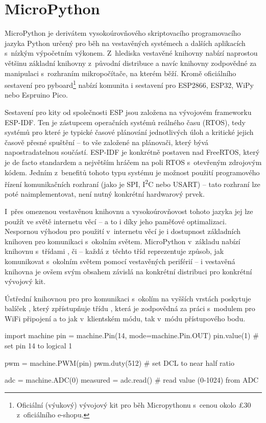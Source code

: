 \section{MicroPython}\label{sec:micropython}
MicroPython je derivátem vysokoúrovňového skriptovacího programovacího jazyka Python určený pro běh na vestavěných
systémech a dalších aplikacích s~nízkým výpočetním výkonem.
Z~hlediska vestavěné knihovny nabízí naprostou většinu základní knihovny z~původní distribuce a navíc knihovny
zodpovědné za manipulaci s~rozhraním mikropočítače, na kterém běží.
Kromě oficiálního sestavení pro pyboard\footnote{Oficiální (výukový) vývojový kit pro běh Micropythonu
s~cenou okolo \pounds30 z~oficiálního e-shopu.} nabízí komunita i sestavení pro ESP2866, ESP32, WiPy nebo Espruino Pico.

Sestavení pro kity od společnosti ESP jsou založena na vývojovém frameworku ESP-IDF.
Ten je zástupcem operačních systémů reálného času (RTOS), tedy systémů pro které je typické časové plánování
jednotlivých úloh a kritické jejich časově přesné spuštění -- to vše založené na plánovači, který bývá
napostradatelnou součástí.
ESP-IDF je konkrétně postaven nad FreeRTOS, který je de facto standardem a největším hráčem na poli RTOS s~otevřeným
zdrojovým kódem. 
Jedním z~benefitů tohoto typu systému je možnost použití programového řízení komunikačních rozhraní
(jako je SPI, I\textsuperscript{2}C nebo USART) -- tato rozhraní lze poté naimplementovat, není nutný konkrétní
hardwarový prvek.

I~přes omezenou vestavěnou knihovnu a vysokoúrovňovost tohoto jazyka jej lze použít ve světě internetu věcí --
a to i díky jeho paměťové optimalizaci.
Nespornou výhodou pro použití v~internetu věcí je i dostupnost základních knihoven pro komunikaci s~okolním světem.
MicroPython v~základu nabízí knihovnu  s~třídami ,  či  --
každá z~těchto tříd reprezentuje způsob, jak komunikovat s~okolním světem pomocí vestavěných periférií
-- i vestavěná knihovna je ovšem svým obsahem závislá na konkrétní distribuci pro konkrétní vývojový kit.

Ústřední knihovnou pro pro komunikaci s~okolím na vyšších vrstách poskytuje balíček , který zpřístupňuje
třídu , která je zodpovědná za práci s~modulem pro WiFi připojení a to jak v~klientském módu, tak v~módu
přístupového bodu.

\begin{code}[language=Python,caption={Ukázka práce s~periferiemi čipu pomocí vestavěných knihoven jazyka MicroPython
-- v~první části se jedná o~nastavení pinu na logickou hodnotu 1, prostřední část patří nastavení pulzně šířkové
modulace (PWM) na pinu čipu a konec je ve znamení čtení z~prvního kanálu analogově-digitálního převodníku (ADC).}]
import machine
pin = machine.Pin(14, mode=machine.Pin.OUT)
pin.value(1) # set pin 14 to logical 1

pwm = machine.PWM(pin)
pwm.duty(512) # set DCL to near half ratio

adc = machine.ADC(0)
measured = adc.read() # read value (0-1024) from ADC
\end{code}

